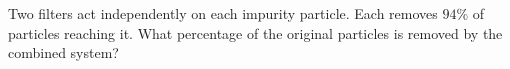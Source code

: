 Two filters act independently on each impurity particle. Each removes $94\%$ of particles reaching it. What percentage of the original particles is removed by the combined system?
